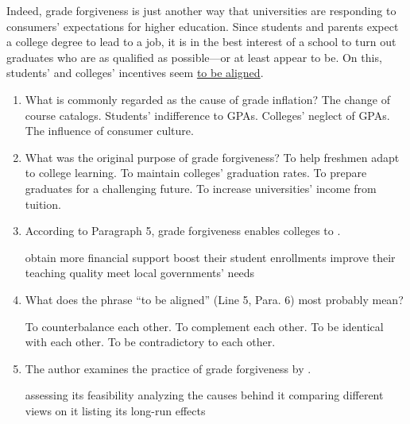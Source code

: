 Indeed, grade forgiveness is just another way that universities
are responding to consumers' expectations for higher education. Since
students and parents expect a college degree to lead to a job, it is in
the best interest of a school to turn out graduates who are as qualified
as possible---or at least appear to be. On this, students' and
colleges' incentives seem  \uline{to be aligned}.


\begin{enumerate}[resume]
	\item
 What is commonly regarded as the cause of grade inflation?
\fourchoices
{The change of course catalogs.}
{Students' indifference to GPAs.}
{Colleges' neglect of GPAs.}
{The influence of consumer culture.}



\item
What was the original purpose of grade forgiveness?
\fourchoices
{To help freshmen adapt to college learning.}
{To maintain colleges' graduation rates.}
{To prepare graduates for a challenging future.}
{To increase universities' income from tuition.}


\item
 According to Paragraph 5, grade forgiveness enables colleges to \lineread.

\fourchoices
{obtain more financial support}
{boost their student enrollments}
{improve their teaching quality}
{meet local governments' needs}



\item
What does the phrase ``to be aligned'' (Line 5, Para. 6) most
probably mean?


\fourchoices
{To counterbalance each other.}
{To complement each other.}
{To be identical with each other.}
{To be contradictory to each other.}



\item
The author examines the practice of grade forgiveness by \lineread.

\fourchoices
{assessing its feasibility}
{analyzing the causes behind it}
{comparing different views on it}
{listing its long-run effects}

\end{enumerate}

